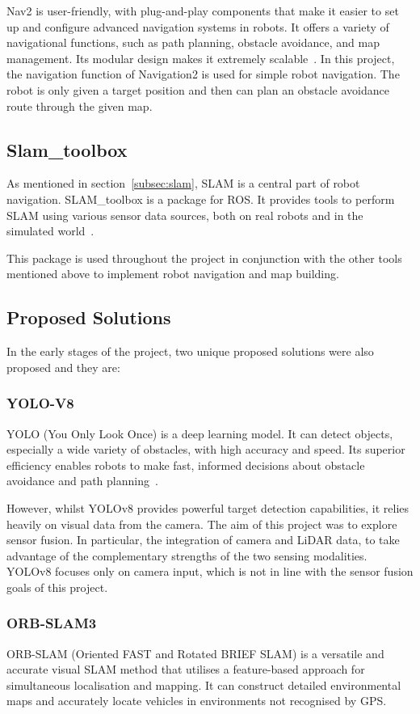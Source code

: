 Nav2 is user-friendly, with plug-and-play components 
that make it easier to set up and configure advanced navigation systems in robots. 
It offers a variety of navigational functions, 
such as path planning, obstacle avoidance, and map management. Its modular design makes it extremely scalable~\cite{nav2doc}. 
In this project, the navigation function of Navigation2 is used for simple robot navigation. 
The robot is only given a target position and then can plan an obstacle avoidance route through the given map.
\subsection{Slam\_toolbox}
As mentioned in section~\ref{subsec:slam}, SLAM is a central part of robot navigation. SLAM\_toolbox is a package for ROS. 
It provides tools to perform SLAM using various sensor data sources, both on real robots and in the simulated world~\cite{slamtoolbox}.

This package is used throughout the project in conjunction with the other tools mentioned above to implement robot navigation and map building.

\subsection{Proposed Solutions}
In the early stages of the project, two unique proposed solutions were also proposed and they are:
\subsubsection{YOLO-V8}
YOLO (You Only Look Once) is a deep learning model. 
It can detect objects, especially a wide variety of obstacles, with high accuracy and speed. 
Its superior efficiency enables robots to make fast, informed decisions about obstacle avoidance and path planning~\cite{yolo}.

However, whilst YOLOv8 provides powerful target detection capabilities, 
it relies heavily on visual data from the camera. 
The aim of this project was to explore sensor fusion. In particular, the integration of camera and LiDAR data, 
to take advantage of the complementary strengths of the two sensing modalities. 
YOLOv8 focuses only on camera input, which is not in line with the sensor fusion goals of this project.
\subsubsection{ORB-SLAM3}
ORB-SLAM (Oriented FAST and Rotated BRIEF SLAM) is a versatile and accurate visual SLAM method 
that utilises a feature-based approach for simultaneous localisation and mapping. 
It can construct detailed environmental maps and accurately locate vehicles in environments not recognised by GPS.


